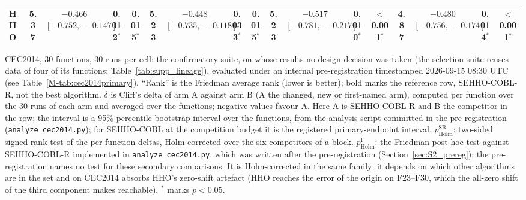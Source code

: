 \begin{table}[htbp]
{\begin{tabular}{lcccccccccccccccc}
HHO & 5.37 & $-0.466$ $[-0.752,\,-0.147]$ & 0.012$^{*}$ & 0.015$^{*}$ & 5.23 & $-0.448$ $[-0.735,\,-0.118]$ & 0.033$^{*}$ & 0.015$^{*}$ & 5.23 & $-0.517$ $[-0.781,\,-0.217]$ & 0.010$^{*}$ & $<$0.001$^{*}$ & 4.87 & $-0.480$ $[-0.756,\,-0.174]$ & 0.014$^{*}$ & $<$0.001$^{*}$ \\
\bottomrule
\end{tabular}}
\begin{flushleft}\footnotesize
CEC2014, 30 functions, 30 runs per cell: the confirmatory suite, on whose results no design decision was taken (the selection suite reuses data of four of its functions; Table~\ref{tab:supp_lineage}), evaluated under an internal pre-registration timestamped 2026-09-15 08:30 UTC (see Table~\ref{M-tab:cec2014primary}). ``Rank'' is the Friedman average rank (lower is better); bold marks the reference row, SEHHO-COBL-R, not the best algorithm. $\delta$ is Cliff's delta of arm A against arm B (A the changed, new or first-named arm), computed per function over the 30 runs of each arm and averaged over the functions; negative values favour A. Here A is SEHHO-COBL-R and B the competitor in the row; the interval is a 95\% percentile bootstrap interval over the functions, from the analysis script committed in the pre-registration (\texttt{analyze\_cec2014.py}); for SEHHO-COBL at the competition budget it is the registered primary-endpoint interval. $p^{\text{SR}}_{\text{Holm}}$: two-sided signed-rank test of the per-function deltas, Holm-corrected over the six competitors of a block. $p^{\text{F}}_{\text{Holm}}$: the Friedman post-hoc test against SEHHO-COBL-R implemented in \texttt{analyze\_cec2014.py}, which was written after the pre-registration (Section~\ref{sec:S2_prereg}); the pre-registration names no test for these secondary comparisons. It is Holm-corrected in the same family; it depends on which other algorithms are in the set and on CEC2014 absorbs HHO's zero-shift artefact (HHO reaches the error of the origin on F23--F30, which the all-zero shift of the third component makes reachable). $^{*}$ marks $p<0.05$.
\end{flushleft}
\end{table}
